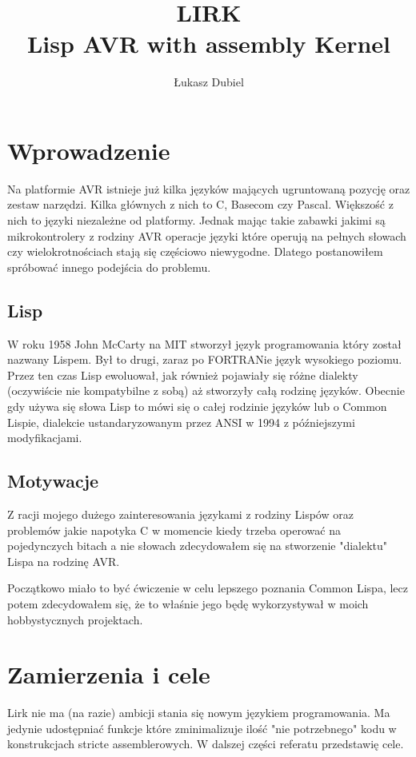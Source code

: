 \documentclass[11pt]{article}
\author{Łukasz Dubiel}
\title{LIRK \\ Lisp AVR with assembly Kernel}
\begin{document}
\maketitle

\section{Wprowadzenie}

Na platformie AVR istnieje już kilka języków mających ugruntowaną pozycję oraz zestaw narzędzi. Kilka głównych z nich to C, Basecom czy Pascal. Większość z nich to języki niezależne od platformy. Jednak mając takie zabawki jakimi są mikrokontrolery z rodziny AVR operacje języki które operują na pełnych słowach czy wielokrotnościach stają się częściowo niewygodne. Dlatego postanowiłem spróbować innego podejścia do problemu.

\subsection{Lisp}

W roku 1958 John McCarty na MIT stworzył język programowania który został nazwany Lispem. Był to drugi, zaraz po FORTRANie język wysokiego poziomu. Przez ten czas Lisp ewoluował, jak również pojawiały się różne dialekty (oczywiście nie kompatybilne z sobą) aż stworzyły całą rodzinę języków. Obecnie gdy używa się słowa Lisp to mówi się o całej rodzinie języków lub o Common Lispie, dialekcie ustandaryzowanym przez ANSI w 1994 z późniejszymi modyfikacjami.

\subsection{Motywacje}

Z racji mojego dużego zainteresowania językami z rodziny Lispów oraz problemów jakie napotyka C w momencie kiedy trzeba operować na pojedynczych bitach a nie słowach zdecydowałem się na stworzenie "dialektu" Lispa na rodzinę AVR. 

Początkowo miało to być ćwiczenie w celu lepszego poznania Common Lispa, lecz potem zdecydowałem się, że to właśnie jego będę wykorzystywał w moich hobbystycznych projektach.

\section{Zamierzenia i cele}
Lirk nie ma (na razie) ambicji stania się nowym językiem programowania. Ma jedynie udostępniać funkcje które zminimalizuje ilość "nie potrzebnego" kodu w konstrukcjach stricte assemblerowych. W dalszej części referatu przedstawię cele.
\end{document}
